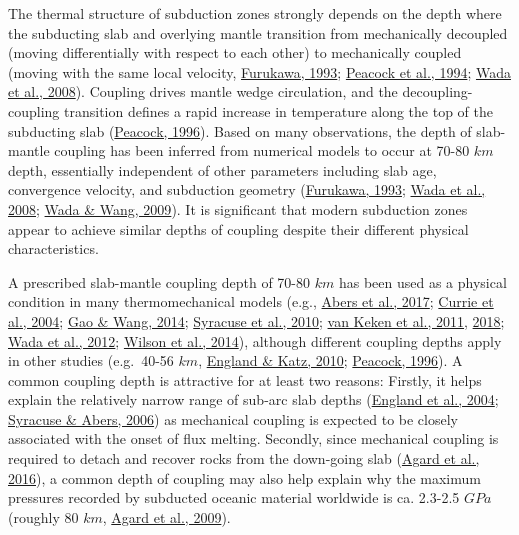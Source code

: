 \documentclass[draft,linenumbers]{agujournal2018}
\begin{document}
The thermal structure of subduction zones strongly depends on the depth
where the subducting slab and overlying mantle transition from
mechanically decoupled (moving differentially with respect to each
other) to mechanically coupled (moving with the same local velocity,
\protect\hyperlink{ref-Furukawa1993}{Furukawa, 1993};
\protect\hyperlink{ref-Peacock1994}{Peacock et al., 1994};
\protect\hyperlink{ref-Wada2008}{Wada et al., 2008}). Coupling drives
mantle wedge circulation, and the decoupling-coupling transition defines
a rapid increase in temperature along the top of the subducting slab
(\protect\hyperlink{ref-Peacock1996}{Peacock, 1996}). Based on many
observations, the depth of slab-mantle coupling has been inferred from
numerical models to occur at 70-80 \(km\) depth, essentially independent
of other parameters including slab age, convergence velocity, and
subduction geometry (\protect\hyperlink{ref-Furukawa1993}{Furukawa,
1993}; \protect\hyperlink{ref-Wada2008}{Wada et al., 2008};
\protect\hyperlink{ref-Wada2009}{Wada \& Wang, 2009}). It is significant
that modern subduction zones appear to achieve similar depths of
coupling despite their different physical characteristics.

A prescribed slab-mantle coupling depth of 70-80 \(km\) has been used as
a physical condition in many thermomechanical models (e.g.,
\protect\hyperlink{ref-Abers2017}{Abers et al., 2017};
\protect\hyperlink{ref-Currie2004}{Currie et al., 2004};
\protect\hyperlink{ref-Gao2014}{Gao \& Wang, 2014};
\protect\hyperlink{ref-Syracuse2010}{Syracuse et al., 2010};
\protect\hyperlink{ref-VanKeken2011}{van Keken et al., 2011},
\protect\hyperlink{ref-VanKeken2018}{2018};
\protect\hyperlink{ref-Wada2012}{Wada et al., 2012};
\protect\hyperlink{ref-Wilson2014}{Wilson et al., 2014}), although
different coupling depths apply in other studies (e.g.~40-56 \(km\),
\protect\hyperlink{ref-England2010}{England \& Katz, 2010};
\protect\hyperlink{ref-Peacock1996}{Peacock, 1996}). A common coupling
depth is attractive for at least two reasons: Firstly, it helps explain
the relatively narrow range of sub-arc slab depths
(\protect\hyperlink{ref-England2004}{England et al., 2004};
\protect\hyperlink{ref-Syracuse2006}{Syracuse \& Abers, 2006}) as
mechanical coupling is expected to be closely associated with the onset
of flux melting. Secondly, since mechanical coupling is required to
detach and recover rocks from the down-going slab
(\protect\hyperlink{ref-Agard2016}{Agard et al., 2016}), a common depth
of coupling may also help explain why the maximum pressures recorded by
subducted oceanic material worldwide is ca. 2.3-2.5 \(GPa\) (roughly 80
\(km\), \protect\hyperlink{ref-Agard2009}{Agard et al., 2009}).
\end{document}

